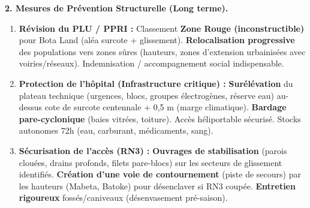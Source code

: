 \documentclass[11pt]{article}
\begin{document}
\begin{exoresolu}
\textbf{2. Mesures de Prévention Structurelle (Long terme).}
\begin{enumerate}
    \item \textbf{Révision du PLU / PPRI :} Classement \textbf{Zone Rouge (inconstructible)} pour Bota Land (aléa surcote + glissement). \textbf{Relocalisation progressive} des populations vers zones sûres (hauteurs, zones d'extension urbainisées avec voiries/réseaux). Indemnisation / accompagnement social indispensable.
    \item \textbf{Protection de l'hôpital (Infrastructure critique) :} \textbf{Surélévation} du plateau technique (urgences, blocs, groupes électrogènes, réserve eau) au-dessus cote de surcote centennale + 0,5 m (marge climatique). \textbf{Bardage pare-cyclonique} (baies vitrées, toiture). Accès héliportable sécurisé. Stocks autonomes 72h (eau, carburant, médicaments, sang).
    \item \textbf{Sécurisation de l'accès (RN3) :} \textbf{Ouvrages de stabilisation} (parois clouées, drains profonds, filets pare-blocs) sur les secteurs de glissement identifiés. \textbf{Création d'une voie de contournement} (piste de secours) par les hauteurs (Mabeta, Batoke) pour désenclaver si RN3 coupée. \textbf{Entretien rigoureux} fossés/caniveaux (désenvasement pré-saison).
\end{enumerate}


\end{exoresolu}
\end{document}
